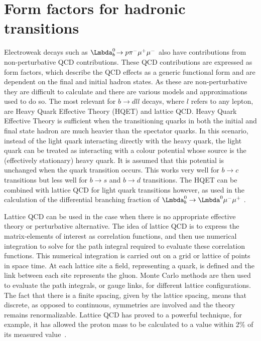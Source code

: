 \section{Form factors for hadronic transitions}
\label{sec:ff}
Electroweak decays such as $\Lbpi$ also have contributions from non-perturbative QCD contributions. These QCD contributions are expressed as form factors,  which describe the QCD effects as a generic functional form and are dependent on the final and initial hadron states. As these are non-perturbative they are difficult to calculate and there are various models and approximations used to do so. The most relevant for $b\to dll$ decays, where $l$ refers to any lepton,  are Heavy Quark Effective Theory (HQET) and lattice QCD. Heavy Quark Effective Theory is sufficient when the transitioning quarks in both the initial and final state hadron are much heavier than the spectator quarks. In this scenario, instead of the light quark interacting directly with the heavy quark, the light quark can be treated as interacting with a colour potential whose source is the (effectively stationary) heavy quark. It is assumed that this potential is unchanged when the quark transition occurs. This works very well for $b\to c$ transitions but less well for $b\to s $ and $b\to d$ transitions. The HQET can be combined with lattice QCD for light quark transitions however, as used in the calculation of the differential branching fraction of $\Lb\to\PLambda^{0}\mun\mup$ \cite{Meinel}. %

Lattice QCD can be used in the case when there is no appropriate effective theory or perturbative alternative. The idea of lattice QCD is to express the matrix-elements of interest as correlation functions, and then use numerical integration to solve for the path integral required to evaluate these correlation functions. This numerical integration is carried out on a grid or lattice of points in space time. At each lattice site a field, representing a quark, is defined and the link between each site represents the gluon. Monte Carlo methods are then used to evaluate the path integrals, or gauge links, for different lattice configurations. The fact that there is a finite spacing, given by the lattice spacing, means that discrete, as opposed to continuous, symmetries are involved and the theory remains renormalizable. Lattice QCD has proved to a powerful technique, for example,  it has allowed the proton mass to be calculated to a value within 2\% of its measured value~\cite{proton}. %


